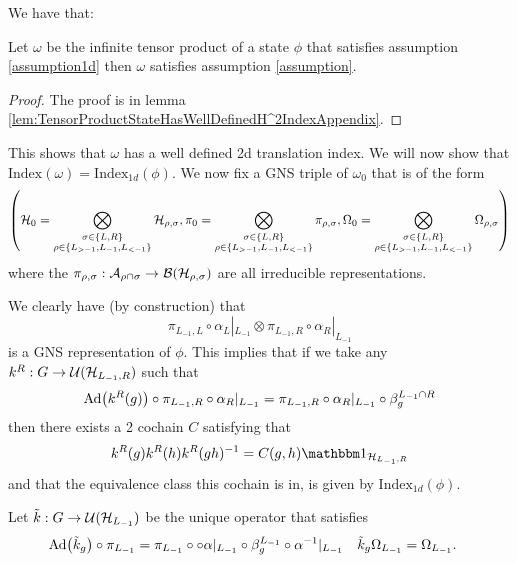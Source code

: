 \documentclass[11pt,a4paper,twoside]{article}
\numberwithin{equation}{section}
\begin{document}
We have that:
\begin{lemma}\label{lem:TensorProductStateHasWellDefinedH^2Index}
	Let $\omega$ be the infinite tensor product of a state $\phi$ that satisfies assumption \ref{assumption1d} then $\omega$ satisfies assumption \ref{assumption}.
\end{lemma}
\begin{proof}
	The proof is in lemma \ref{lem:TensorProductStateHasWellDefinedH^2IndexAppendix}.
\end{proof}
This shows that $\omega$ has a well defined 2d translation index. We will now show that $\textrm{Index}(\omega)=\textrm{Index}_{1d}(\phi)$. We now fix a GNS triple of $\omega_0$ that is of the form
\begin{equation}
	\left(\HH_0=\bigotimes_{\substack{\sigma\in\{L,R\}\\ \rho\in\{L_{>-1},L_{-1},L_{<-1}\}}}\HH_{\rho,\sigma},\pi_0=\bigotimes_{\substack{\sigma\in\{L,R\}\\ \rho\in\{L_{>-1},L_{-1},L_{<-1}\}}}\pi_{\rho,\sigma},\Omega_0=\bigotimes_{\substack{\sigma\in\{L,R\}\\ \rho\in\{L_{>-1},L_{-1},L_{<-1}\}}}\Omega_{\rho,\sigma}\right)
\end{equation}
where the $\pi_{\rho,\sigma}:\mathcal A_{\rho\cap\sigma}\rightarrow\mathcal B(\mathcal H_{\rho,\sigma})$ are all irreducible representations.
\begin{remark}\label{rem:GNS_One_Dimensional}
	We clearly have (by construction) that
	\begin{equation}
		\pi_{L_{-1},L}\circ\alpha_L|_{L_{-1}}\otimes \pi_{L_{-1},R}\circ\alpha_R|_{L_{-1}}
	\end{equation}
	is a GNS representation of $\phi$. This implies that if we take any $k^R:G\rightarrow \mathcal U(\mathcal H_{L_{-1},R})$ such that
	\begin{equation}
		\Ad{k^R(g)}\circ\pi_{L_{-1},R}\circ\alpha_R|_{L_{-1}}=\pi_{L_{-1},R}\circ\alpha_R|_{L_{-1}}\circ\beta_{g}^{L_{-1}\cap R}
	\end{equation}
	then there exists a 2 cochain $C$ satisfying that
	\begin{equation}
		k^R(g)k^R(h)k^R(gh)^{-1}=C(g,h)\id_{\HH_{L_{-1},R}}
	\end{equation}
	and that the equivalence class this cochain is in, is given by $\textrm{Index}_{1d}(\phi)$.
\end{remark}
Let $\tilde k:G\rightarrow \mathcal U(\mathcal H_{L_{-1}})$ be the unique operator that satisfies
\begin{align}
	\Ad{\tilde{k}_g}\circ\pi_{L_{-1}}&=\pi_{L_{-1}}\circ \circ\alpha|_{L_{-1}}\circ\beta_g^{L_{-1}}\circ \alpha^{-1}|_{L_{-1}}&\tilde k_g\Omega_{L_{-1}}&=\Omega_{L_{-1}}.
\end{align}
\end{document}
